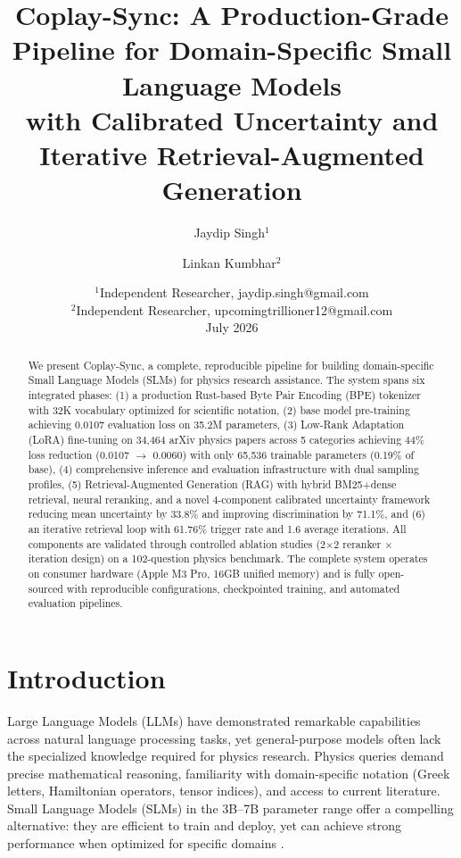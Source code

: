 \documentclass[11pt,a4paper]{article}
\title{Coplay-Sync: A Production-Grade Pipeline for Domain-Specific Small Language Models\\with Calibrated Uncertainty and Iterative Retrieval-Augmented Generation}
\author{Jaydip Singh$^{1}$ \and Linkan Kumbhar$^{2}$}
\date{$^{1}$Independent Researcher, jaydip.singh@gmail.com\\$^{2}$Independent Researcher, upcomingtrillioner12@gmail.com\\July 2026}
\begin{document}
\maketitle

\begin{abstract}
We present Coplay-Sync, a complete, reproducible pipeline for building domain-specific Small Language Models (SLMs) for physics research assistance. The system spans six integrated phases: (1) a production Rust-based Byte Pair Encoding (BPE) tokenizer with 32K vocabulary optimized for scientific notation, (2) base model pre-training achieving 0.0107 evaluation loss on 35.2M parameters, (3) Low-Rank Adaptation (LoRA) fine-tuning on 34,464 arXiv physics papers across 5 categories achieving 44\% loss reduction (0.0107 $\rightarrow$ 0.0060) with only 65,536 trainable parameters (0.19\% of base), (4) comprehensive inference and evaluation infrastructure with dual sampling profiles, (5) Retrieval-Augmented Generation (RAG) with hybrid BM25+dense retrieval, neural reranking, and a novel 4-component calibrated uncertainty framework reducing mean uncertainty by 33.8\% and improving discrimination by 71.1\%, and (6) an iterative retrieval loop with 61.76\% trigger rate and 1.6 average iterations. All components are validated through controlled ablation studies (2$\times$2 reranker $\times$ iteration design) on a 102-question physics benchmark. The complete system operates on consumer hardware (Apple M3 Pro, 16GB unified memory) and is fully open-sourced with reproducible configurations, checkpointed training, and automated evaluation pipelines.
\end{abstract}

\section{Introduction}

Large Language Models (LLMs) have demonstrated remarkable capabilities across natural language processing tasks, yet general-purpose models often lack the specialized knowledge required for physics research. Physics queries demand precise mathematical reasoning, familiarity with domain-specific notation (Greek letters, Hamiltonian operators, tensor indices), and access to current literature. Small Language Models (SLMs) in the 3B--7B parameter range offer a compelling alternative: they are efficient to train and deploy, yet can achieve strong performance when optimized for specific domains \cite{eldan2023tinystories}.
\end{document}
